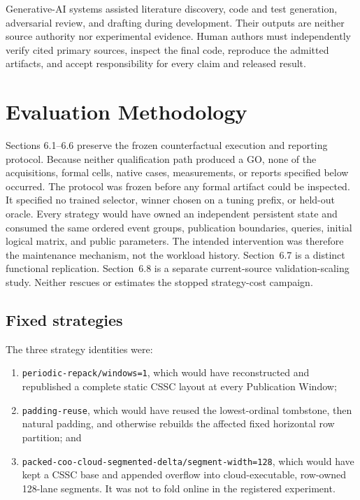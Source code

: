 Generative-AI systems assisted literature discovery, code and test generation, adversarial review, and drafting during development. Their outputs are neither source authority nor experimental evidence. Human authors must independently verify cited primary sources, inspect the final code, reproduce the admitted artifacts, and accept responsibility for every claim and released result.

\section{Evaluation Methodology}\label{evaluation-methodology}

Sections 6.1--6.6 preserve the frozen counterfactual execution and reporting protocol. Because neither qualification path produced a GO, none of the acquisitions, formal cells, native cases, measurements, or reports specified below occurred. The protocol was frozen before any formal artifact could be inspected. It specified no trained selector, winner chosen on a tuning prefix, or held-out oracle. Every strategy would have owned an independent persistent state and consumed the same ordered event groups, publication boundaries, queries, initial logical matrix, and public parameters. The intended intervention was therefore the maintenance mechanism, not the workload history. Section~6.7 is a distinct functional replication. Section~6.8 is a separate current-source validation-scaling study. Neither rescues or estimates the stopped strategy-cost campaign.

\subsection{Fixed strategies}\label{fixed-strategies}

The three strategy identities were:

\begin{enumerate}
\def\labelenumi{\arabic{enumi}.}
\tightlist
\item
  \texttt{periodic-repack/windows=1}, which would have reconstructed and republished a complete static CSSC layout at every Publication Window;
\item
  \texttt{padding-reuse}, which would have reused the lowest-ordinal tombstone, then natural padding, and otherwise rebuilds the affected fixed horizontal row partition; and
\item
  \texttt{packed-coo-cloud-segmented-delta/segment-width=128}, which would have kept a CSSC base and appended overflow into cloud-executable, row-owned 128-lane segments. It was not to fold online in the registered experiment.
\end{enumerate}

